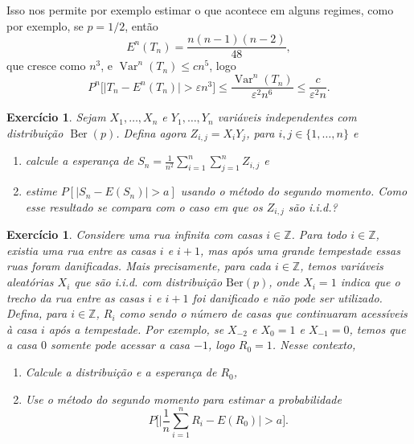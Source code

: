 \documentclass[reqno, final]{book}
\newcommand*\1{\mathds{1}}
\newtheorem{exercise}[example]{Exercício}
\DeclareMathOperator{\Var}{Var}
\DeclareMathOperator{\Ber}{Ber}
\begin{document}
Isso nos permite por exemplo estimar o que acontece em alguns regimes, como por exemplo, se $p = 1/2$, então
\begin{equation}
  E^n(T_n) = \frac{n(n-1)(n-2)}{48},
\end{equation}
que cresce como $n^3$, e $\Var^n(T_n) \leq c n^5$, logo
\begin{equation}
  P^n\Big[ \Big|T_n - E^n(T_n)\Big| > \varepsilon n^3 \Big] \leq \frac{\Var^n(T_n)}{\varepsilon^2 n^6} \leq \frac{c}{\varepsilon^2 n}.
\end{equation}

\begin{exercise}
  Sejam $X_1, \dots, X_n$ e $Y_1, \dots, Y_n$ variáveis independentes com distribuição $\Ber(p)$.
  Defina agora $Z_{i,j} = X_i Y_j$, para $i, j \in \{1, \dots, n\}$ e
  \begin{enumerate}[\quad a)]
  \item calcule a esperança de $S_n = \tfrac{1}{n^2} \sum_{i=1}^n \sum_{j=1}^n Z_{i,j}$ e
  \item estime $P[|S_n - E(S_n)| > a]$ usando o método do segundo momento. Como esse resultado se compara com o caso em que os $Z_{i,j}$ são i.i.d.?
  \end{enumerate}
\end{exercise}

\begin{exercise}
  \label{x:casas_tempestade}
  Considere uma rua infinita com casas $i \in \mathbb{Z}$.
  Para todo $i \in \mathbb{Z}$, existia uma rua entre as casas $i$ e $i+1$, mas após uma grande tempestade essas ruas foram danificadas.
  Mais precisamente, para cada $i \in \mathbb{Z}$, temos variáveis aleatórias $X_i$ que são i.i.d. com distribuição $\text{Ber}(p)$, onde $X_i = 1$ indica que o trecho da rua entre as casas $i$ e $i + 1$ foi danificado e não pode ser utilizado.
  Defina, para $i \in \mathbb{Z}$, $R_i$ como sendo o número de casas que continuaram acessíveis à casa $i$ após a tempestade.
  Por exemplo, se $X_{-2}$ e $X_0 = 1$ e $X_{-1} = 0$, temos que a casa $0$ somente pode acessar a casa $-1$, logo $R_0 = 1$.
  Nesse contexto,
  \begin{enumerate}[\quad a)]
  \item Calcule a distribuição e a esperança de $R_0$,
  \item Use o método do segundo momento para estimar a probabilidade
    \begin{equation}
      P \Big[ \Big| \frac{1}{n} \sum_{i=1}^n R_i - E(R_0) \Big| > a \Big].
    \end{equation}
  \end{enumerate}
\end{exercise}
\end{document}
